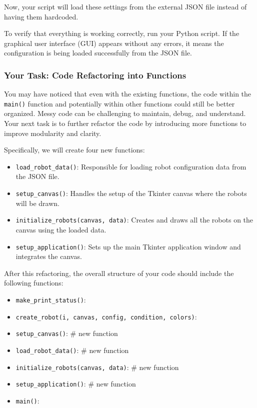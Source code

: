 Now, your script will load these settings from the external JSON file instead of having them hardcoded.

To verify that everything is working correctly, run your Python script. If the graphical user interface (GUI) appears without any errors, it means the configuration is being loaded successfully from the JSON file.

\subsubsection{Your Task: Code Refactoring into Functions}
You may have noticed that even with the existing functions, the code within the \texttt{main()} function and potentially within other functions could still be better organized. Messy code can be challenging to maintain, debug, and understand. Your next task is to further refactor the code by introducing more functions to improve modularity and clarity.

Specifically, we will create four new functions:

\begin{itemize}\setlength{\itemsep}{5pt}
\item \texttt{load\_robot\_data()}: Responsible for loading robot configuration data from the JSON file.
\item \texttt{setup\_canvas()}: Handles the setup of the Tkinter canvas where the robots will be drawn.
\item \texttt{initialize\_robots(canvas, data)}: Creates and draws all the robots on the canvas using the loaded data.
\item \texttt{setup\_application()}: Sets up the main Tkinter application window and integrates the canvas.
\end{itemize}

After this refactoring, the overall structure of your code should include the following functions:

\begin{itemize}\setlength{\itemsep}{5pt}
\item \texttt{make\_print\_status()}:
\item \texttt{create\_robot(i, canvas, config, condition, colors)}:
\item \texttt{setup\_canvas()}: \# new function
\item \texttt{load\_robot\_data()}: \# new function
\item \texttt{initialize\_robots(canvas, data)}: \# new function
\item \texttt{setup\_application()}: \# new function
\item \texttt{main()}:
\end{itemize}

